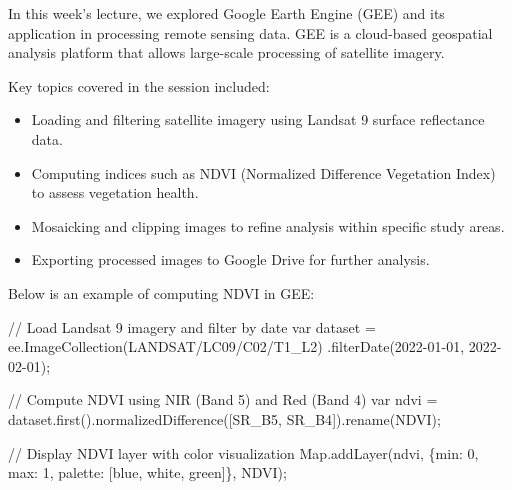 \documentclass[
  letterpaper,
  DIV=11,
  numbers=noendperiod]{scrreprt}
\newenvironment{Shaded}{\begin{snugshade}}{\end{snugshade}}
\newcommand{\BuiltInTok}[1]{\textcolor[rgb]{0.00,0.23,0.31}{#1}}
\newcommand{\CommentTok}[1]{\textcolor[rgb]{0.37,0.37,0.37}{#1}}
\newcommand{\DataTypeTok}[1]{\textcolor[rgb]{0.68,0.00,0.00}{#1}}
\newcommand{\DecValTok}[1]{\textcolor[rgb]{0.68,0.00,0.00}{#1}}
\newcommand{\FunctionTok}[1]{\textcolor[rgb]{0.28,0.35,0.67}{#1}}
\newcommand{\KeywordTok}[1]{\textcolor[rgb]{0.00,0.23,0.31}{#1}}
\newcommand{\NormalTok}[1]{\textcolor[rgb]{0.00,0.23,0.31}{#1}}
\newcommand{\OperatorTok}[1]{\textcolor[rgb]{0.37,0.37,0.37}{#1}}
\newcommand{\StringTok}[1]{\textcolor[rgb]{0.13,0.47,0.30}{#1}}
\providecommand{\tightlist}{%
  \setlength{\itemsep}{0pt}\setlength{\parskip}{0pt}}\usepackage{longtable,booktabs,array}
\begin{document}
In this week's lecture, we explored Google Earth Engine (GEE) and its
application in processing remote sensing data. GEE is a cloud-based
geospatial analysis platform that allows large-scale processing of
satellite imagery.

Key topics covered in the session included:

\begin{itemize}
\tightlist
\item
  Loading and filtering satellite imagery using Landsat 9 surface
  reflectance data.
\item
  Computing indices such as NDVI (Normalized Difference Vegetation
  Index) to assess vegetation health.
\item
  Mosaicking and clipping images to refine analysis within specific
  study areas.
\item
  Exporting processed images to Google Drive for further analysis.
\end{itemize}

Below is an example of computing NDVI in GEE:

\begin{Shaded}
\begin{Highlighting}[]
\CommentTok{// Load Landsat 9 imagery and filter by date}
\KeywordTok{var}\NormalTok{ dataset }\OperatorTok{=}\NormalTok{ ee}\OperatorTok{.}\FunctionTok{ImageCollection}\NormalTok{(}\StringTok{\textquotesingle{}LANDSAT/LC09/C02/T1\_L2\textquotesingle{}}\NormalTok{)}
    \OperatorTok{.}\FunctionTok{filterDate}\NormalTok{(}\StringTok{\textquotesingle{}2022{-}01{-}01\textquotesingle{}}\OperatorTok{,} \StringTok{\textquotesingle{}2022{-}02{-}01\textquotesingle{}}\NormalTok{)}\OperatorTok{;}

\CommentTok{// Compute NDVI using NIR (Band 5) and Red (Band 4)}
\KeywordTok{var}\NormalTok{ ndvi }\OperatorTok{=}\NormalTok{ dataset}\OperatorTok{.}\FunctionTok{first}\NormalTok{()}\OperatorTok{.}\FunctionTok{normalizedDifference}\NormalTok{([}\StringTok{\textquotesingle{}SR\_B5\textquotesingle{}}\OperatorTok{,} \StringTok{\textquotesingle{}SR\_B4\textquotesingle{}}\NormalTok{])}\OperatorTok{.}\FunctionTok{rename}\NormalTok{(}\StringTok{\textquotesingle{}NDVI\textquotesingle{}}\NormalTok{)}\OperatorTok{;}

\CommentTok{// Display NDVI layer with color visualization}
\BuiltInTok{Map}\OperatorTok{.}\FunctionTok{addLayer}\NormalTok{(ndvi}\OperatorTok{,}\NormalTok{ \{}\DataTypeTok{min}\OperatorTok{:} \DecValTok{0}\OperatorTok{,} \DataTypeTok{max}\OperatorTok{:} \DecValTok{1}\OperatorTok{,} \DataTypeTok{palette}\OperatorTok{:}\NormalTok{ [}\StringTok{\textquotesingle{}blue\textquotesingle{}}\OperatorTok{,} \StringTok{\textquotesingle{}white\textquotesingle{}}\OperatorTok{,} \StringTok{\textquotesingle{}green\textquotesingle{}}\NormalTok{]\}}\OperatorTok{,} \StringTok{\textquotesingle{}NDVI\textquotesingle{}}\NormalTok{)}\OperatorTok{;}
\end{Highlighting}
\end{Shaded}
\end{document}
